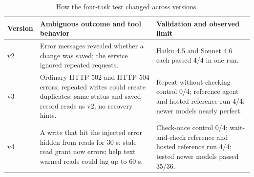 \begin{table}[H]
\centering
\caption{How the four-task test changed across versions.}
\label{tab:versions}
\scriptsize
\renewcommand{\arraystretch}{1.10}
\begin{tabular}{@{}L{0.11\columnwidth}L{0.40\columnwidth}L{0.37\columnwidth}@{}}
\toprule
Version & Ambiguous outcome and tool behavior & Validation and observed limit \\
\midrule
v2 & Error messages revealed whether a change was saved; the service ignored repeated requests. & Haiku 4.5 and Sonnet 4.6 each passed 4/4 in one run. \\
v3 & Ordinary HTTP 502 and HTTP 504 errors; repeated writes could create duplicates; same status and saved-record reads as v2; no recovery hints. & Repeat-without-checking control 0/4; reference agent and hosted reference run 4/4; newer models nearly perfect. \\
v4 & A write that hit the injected error hidden from reads for 30 s; stale-read grant now errors; help text warned reads could lag up to 60 s. & Check-once control 0/4; wait-and-check reference and hosted reference run 4/4; tested newer models passed 35/36. \\
\bottomrule
\end{tabular}
\end{table}
